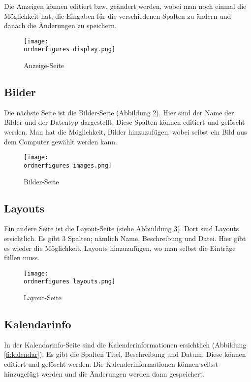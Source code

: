 Die Anzeigen können editiert bzw. geändert werden, wobei man noch einmal die Möglichkeit hat, die Eingaben für die verschiedenen Spalten zu ändern und danach die Änderungen zu speichern.

\begin{figure}[H]
	\centering
	\texttt{[image: \\ordnerfigures display.png]}
	\caption{Anzeige-Seite}
	\label{fi:anzeige}
\end{figure}


\subsection{Bilder}

Die nächste Seite ist die Bilder-Seite (Abbildung \ref{fi:images}). Hier sind der Name der Bilder und der Datentyp dargestellt. Diese Spalten können editiert und gelöscht werden. Man hat die Möglichkeit, Bilder hinzuzufügen, wobei selbst ein Bild aus dem Computer gewählt werden kann.

\begin{figure}[H]
	\centering
	\texttt{[image: \\ordnerfigures images.png]}
	\caption{Bilder-Seite}
	\label{fi:images}
\end{figure}


\subsection{Layouts}
Ein andere Seite ist die Layout-Seite (siehe Abbinldung \ref{fi:layouts}). Dort sind Layouts ersichtlich. Es gibt 3 Spalten; nämlich Name, Beschreibung und Datei. Hier gibt es wieder die Möglichkeit, Layouts hinzuzufügen, wo man selbst die Einträge füllen muss.

\begin{figure}[H]
	\centering
	\texttt{[image: \\ordnerfigures layouts.png]}
	\caption{Layout-Seite}
	\label{fi:layouts}
\end{figure}

\subsection{Kalendarinfo}

In der Kalendarinfo-Seite sind die Kalenderinformationen ersichtlich (Abbildung \ref{fi:kalendar}). Es gibt die Spalten Titel, Beschreibung und Datum. Diese können editiert und gelöscht werden. Die Kalenderinformationen können selbst hinzugefügt werden und die Änderungen werden dann gespeichert.

